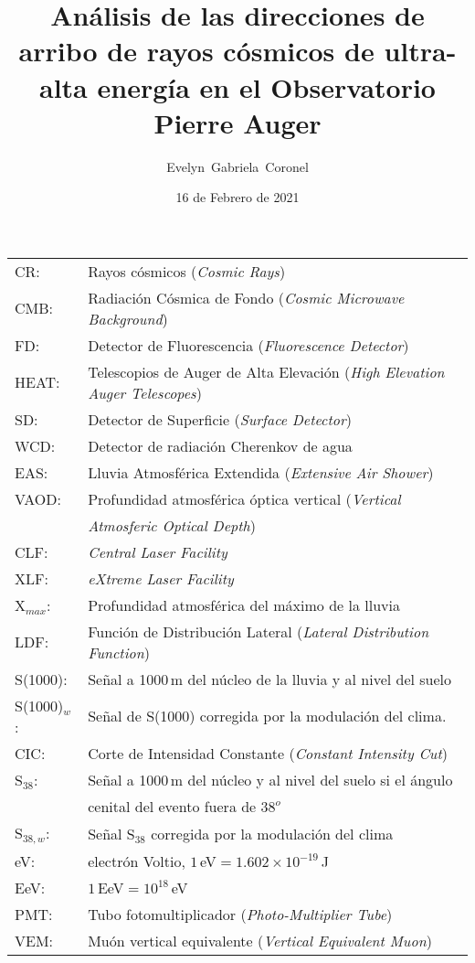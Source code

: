 \documentclass[12pt,papel,twoside,pagebackref]{ibtesis}
\title{Análisis de las direcciones de arribo de rayos cósmicos de ultra-alta energía en el Observatorio Pierre Auger}
\author{Evelyn~Gabriela~Coronel}
\date{16 de Febrero de 2021}
\begin{document}
\begin{preliminary}


\begin{abreviaturas}

\begin{tabular}{l l}
CR: 		& Rayos cósmicos  (\emph{Cosmic Rays}) \\
CMB: 		& Radiación Cósmica de Fondo (\emph{Cosmic Microwave Background})\\
FD: 		& Detector de Fluorescencia (\emph{Fluorescence Detector}) \\
HEAT:		& Telescopios de Auger de Alta Elevación (\emph{High Elevation Auger Telescopes})\\
SD: 		& Detector de Superficie (\emph{Surface Detector})  \\
WCD: 		& Detector de radiación Cherenkov de agua\\
EAS: 		& Lluvia Atmosférica Extendida  (\emph{Extensive Air Shower})    \\
VAOD: 		& Profundidad atmosférica óptica vertical (\emph{Vertical} \\
			& \emph{Atmosferic Optical Depth})\\
CLF:		& \emph{Central Laser Facility}\\
XLF:		& \emph{eXtreme Laser Facility}\\
X$_{max}$: 	& Profundidad atmosférica del máximo de la lluvia \\
LDF: 		& Función de Distribución Lateral (\emph{Lateral Distribution Function}) \\
S(1000): 	& Señal a 1000\,m del núcleo de la lluvia y al nivel del suelo \\
S(1000)$_w$:& Señal de S(1000) corregida por la modulación del clima. \\
CIC: 		& Corte de Intensidad Constante (\emph{Constant Intensity Cut}) \\
S$_{38}$: 	& Señal a 1000\,m del núcleo y al nivel del suelo si el ángulo\\
			& cenital del evento fuera de $38^o$\\
S$_{38,w}$: & Señal S$_{38}$ corregida por la modulación del clima \\
eV: 		& electrón Voltio, $1\,$eV$= 1.602\times 10^{-19}\,$J \\
EeV: 		& $1\,$EeV$=10^{18}\,$eV\\
PMT: 		& Tubo fotomultiplicador (\emph{Photo-Multiplier Tube})\\
VEM: 		& Muón vertical equivalente (\emph{Vertical Equivalent Muon})\\

\end{tabular}
\end{abreviaturas}
\end{preliminary}
\end{document}
